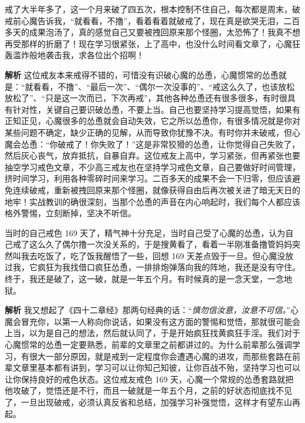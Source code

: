 \begin{case}[不要听信心魔的怂恿]
    戒了大半年多了，这一个月来破了四五次，根本控制不住自己，每次都是周末，破戒前心魔告诉我，“就看看，不撸”，看着看着就破戒了，现在真是欲哭无泪，二百多天的成果泡汤了，真的感觉自己又要被拽回原来那个怪圈，太恐怖了！我真不想再受那样的折磨了！现在学习很紧张，上了高中，也没什么时间看文章了，心魔狂轰滥炸般地袭击我，求各位出个招啊！

    \textbf{解析} 这位戒友本来戒得不错的，可惜没有识破心魔的怂恿，心魔惯常的怂恿就是：“就看看，不撸”、“最后一次”、“偶尔一次没事的”、“戒这么久了，也该放松放松了”、“只是这一次而已，下次再戒”，其他各种怂恿还有很多很多，有时很具有针对性，关键自己要识破怂恿，不要上当。自己也要坚持学习提高觉悟，如果有正知正见，心魔很多的怂恿就会自动失效，它之所以怂恿你，有很多情况就是你对某些问题不确定，缺少正确的见解，从而导致你犹豫不决。有时你并未破戒，但心魔会怂恿：“你破戒了！你失败了！”这是非常狡猾的怂恿，让你觉得自己失败了，然后灰心丧气，放弃抵抗，自暴自弃。这位戒友上高中，学习紧张，但再紧张也要抽空学习戒色文章，不少高三戒友也在坚持学习戒色文章，自己要做好时间管理，挤时间学习，利用各种零碎时间来学习。二百多天的成果不会一下归零，但应该避免连续破戒，重新被拽回原来那个怪圈，就像获得自由后再次被关进了暗无天日的地牢！实战教训的确很深刻，当那个怂恿的声音在内心响起时，我们每个人都应该格外警惕，立刻断掉，坚决不听信。
\end{case}

\begin{case}[不要听信心魔的怂恿]
    当时的自己戒色 169 天了，精气神十分充足，当时自己受了心魔的怂恿，认为自己戒了这么久了偶尔撸一次没关系的，于是搜黄看了，看着一半刚准备撸管妈妈突然叫我去吃饭了，吃了饭我醒悟了一些，回想 169 天差点毁于一旦。但心魔没放过我，它疯狂为我找借口疯狂怂恿，一排排炮弹落向我的阵地，我还是没有守住。终于，我还是破了，这一破，就是一年五个月。有时候真的是一念天堂，一念地狱。

    \textbf{解析} 我又想起了《四十二章经》那两句经典的话：“\textit{慎勿信汝意，汝意不可信。}”心魔会冒充你，以第一人称向你说话，如果没有这方面的警惕和觉悟，那就很可能会上当，以为是自己的想法，然后就认同了，于是开始疯狂找黄疯狂手淫。我们对于心魔惯常的怂恿一定要熟悉，前辈的文章里之前都讲过的。为什么前辈那么强调学习，有很大一部分原因，就是戒到一定程度你会遭遇心魔的进攻，而那些套路在前辈文章里基本都有讲到，学习可以让你知己知彼，让你百战不殆，坚持学习也可以让你保持良好的戒色状态。这位戒友戒色 169 天，心魔一个常规的怂恿套路就把他攻破了，觉悟还是不行，而且一破就是一年五个月，之前的好状态彻底找不见了，一旦出现破戒，必须认真反省和总结，加强学习补强觉悟，这样才有望东山再起。
\end{case}

